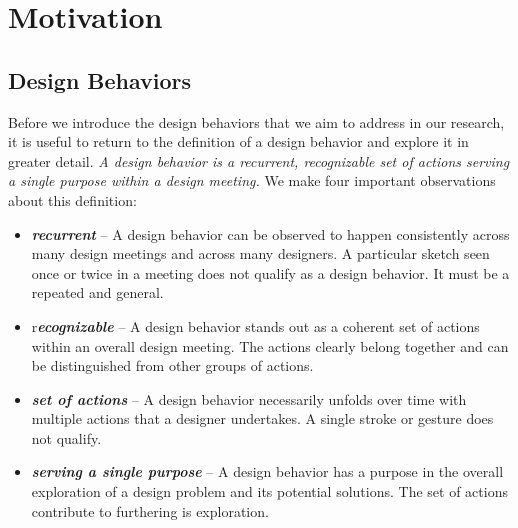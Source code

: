 \chapter{Motivation}
\label{chapter:motivation}

\section{Design Behaviors}

Before we introduce the design behaviors that we aim to address in our research, it is useful to return to the definition of a design behavior and explore it in greater detail. \emph{A design behavior is a recurrent, recognizable set of actions serving a single purpose within a design meeting.} We make four important observations about this definition:

\begin{itemize}
\item \textbf{\emph{recurrent}} -- A design behavior can be observed to happen consistently across many design meetings and across many designers. A particular sketch seen once or twice in a meeting does not qualify as a design behavior. It must be a repeated and general.
\item r\textbf{\emph{ecognizable}} -- A design behavior stands out as a coherent set of actions within an overall design meeting. The actions clearly belong together and can be distinguished from other groups of actions.
\item \textbf{\emph{set of actions}} -- A design behavior necessarily unfolds over time with multiple actions that a designer undertakes. A single stroke or gesture does not qualify. 
\item \textbf{\emph{serving a single purpose}} -- A design behavior has a purpose in the overall exploration of a design problem and its potential solutions. The set of actions contribute to furthering is exploration.  
\end{itemize}

